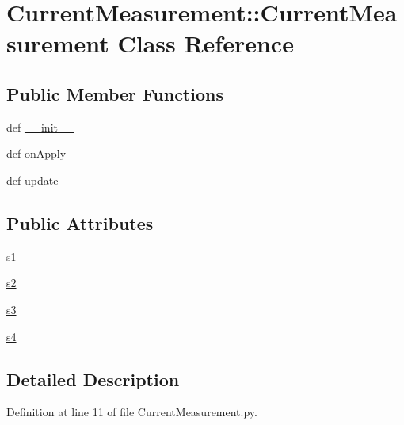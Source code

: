 \hypertarget{classCurrentMeasurement_1_1CurrentMeasurement}{
\section{CurrentMeasurement::CurrentMeasurement Class Reference}
\label{classCurrentMeasurement_1_1CurrentMeasurement}
}
\subsection*{Public Member Functions}
\begin{DoxyCompactItemize}
\item 
def \hyperlink{classCurrentMeasurement_1_1CurrentMeasurement_a8d86e531d513ee677b94705b0463e50c}{\_\-\_\-init\_\-\_\-}
\item 
def \hyperlink{classCurrentMeasurement_1_1CurrentMeasurement_a9e6507d2178348375ccd74ad1cf31cae}{onApply}
\item 
def \hyperlink{classCurrentMeasurement_1_1CurrentMeasurement_a982772cd38be997fa14bec525e04ca11}{update}
\end{DoxyCompactItemize}
\subsection*{Public Attributes}
\begin{DoxyCompactItemize}
\item 
\hyperlink{classCurrentMeasurement_1_1CurrentMeasurement_a42bc14191333b5834010b05d2ca3ece6}{s1}
\item 
\hyperlink{classCurrentMeasurement_1_1CurrentMeasurement_ad88b00c17c89b2c02193c926e1198ca7}{s2}
\item 
\hyperlink{classCurrentMeasurement_1_1CurrentMeasurement_aae05b51df6c8e3cee2133eca4aee1f86}{s3}
\item 
\hyperlink{classCurrentMeasurement_1_1CurrentMeasurement_af84388267bc65ccd644639685d6e858c}{s4}
\end{DoxyCompactItemize}


\subsection{Detailed Description}


Definition at line 11 of file CurrentMeasurement.py.

